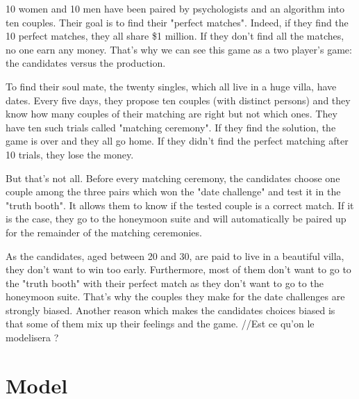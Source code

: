 \documentclass[a4,12pt]{article}
\begin{document}
\begin{mdframed}[style=exampledefault]
10 women and 10 men have been paired by psychologists and an algorithm into ten couples. Their goal is to find their "perfect matches". Indeed, if they find the 10 perfect matches, they all share \$1 million. If they don't find all the matches, no one earn any money.
That's why we can see this game as a two player's game: the candidates versus the production. \vspace{2mm}

To find their soul mate, the twenty singles, which all live in a huge villa, have dates. \newline
Every five days, they propose ten couples (with distinct persons) and they know how many couples of their matching are right but not which ones. They have ten such trials called "matching ceremony". If they find the solution, the game is over and they all go home. If they didn't find the perfect matching after 10 trials, they lose the money. \vspace{2mm}

But that's not all. Before every matching ceremony, the candidates choose one couple among the three pairs which won the "date challenge" and test it in the "truth booth". It allows them to know if the tested couple is a correct match. If it is the case, they go to the honeymoon suite and will automatically be paired up for the remainder of the matching ceremonies. \vspace{2mm}

As the candidates, aged between 20 and 30, are paid to live in a beautiful villa, they don't want to win too early. Furthermore, most of them don't want to go to the "truth booth" with their perfect match as they don't want to go to the honeymoon suite. That's why the couples they make for the date challenges are strongly biased. \newline
Another reason which makes the candidates choices biased is that some of them mix up their feelings and the game. //Est ce qu'on le modelisera ? 

\end{mdframed}
 
\section*{Model}
\end{document}
